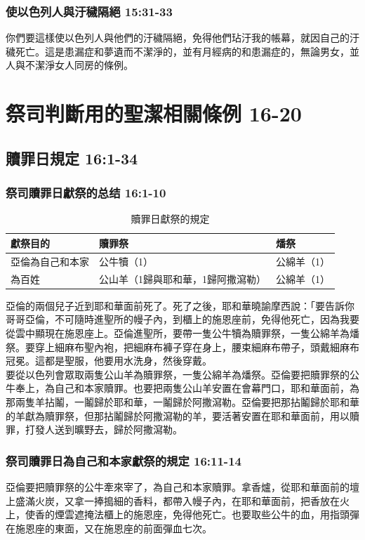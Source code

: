 \subsubsection{使以色列人與汙穢隔絕 15:31-33}
你們要這樣使以色列人與他們的汙穢隔絕，免得他們玷汙我的帳幕，就因自己的汙穢死亡。這是患漏症和夢遺而不潔淨的，並有月經病的和患漏症的，無論男女，並人與不潔淨女人同房的條例。 
    
\section{祭司判斷用的聖潔相關條例 16-20}
\subsection{贖罪日規定 16:1-34}
\subsubsection{祭司贖罪日獻祭的总结 16:1-10}
\begin{table}%
\vspace*{-3mm} 
\centering
\begin{tabular}{ l|l|l }
\hline
\hline
 獻祭目的       &   贖罪祭    &  燔祭        \\ \hline
亞倫為自己和本家& 公牛犢（1） &  公綿羊（1） \\ \hline
為百姓          & 公山羊（1歸與耶和華，1歸阿撒瀉勒） &公綿羊（1）\\\hline
\end{tabular}
\caption{贖罪日獻祭的規定}
\end{table}

亞倫的兩個兒子近到耶和華面前死了。死了之後，耶和華曉諭摩西說：「要告訴你哥哥亞倫，不可隨時進聖所的幔子內，到櫃上的施恩座前，免得他死亡，因為我要從雲中顯現在施恩座上。亞倫進聖所，要帶一隻公牛犢為贖罪祭，一隻公綿羊為燔祭。要穿上細麻布聖內袍，把細麻布褲子穿在身上，腰束細麻布帶子，頭戴細麻布冠冕。這都是聖服，他要用水洗身，然後穿戴。\\
要從以色列會眾取兩隻公山羊為贖罪祭，一隻公綿羊為燔祭。亞倫要把贖罪祭的公牛奉上，為自己和本家贖罪。也要把兩隻公山羊安置在會幕門口，耶和華面前，為那兩隻羊拈鬮，一鬮歸於耶和華，一鬮歸於阿撒瀉勒。亞倫要把那拈鬮歸於耶和華的羊獻為贖罪祭，但那拈鬮歸於阿撒瀉勒的羊，要活著安置在耶和華面前，用以贖罪，打發人送到曠野去，歸於阿撒瀉勒。

\subsubsection{祭司贖罪日為自己和本家獻祭的規定 16:11-14}
亞倫要把贖罪祭的公牛牽來宰了，為自己和本家贖罪。拿香爐，從耶和華面前的壇上盛滿火炭，又拿一捧搗細的香料，都帶入幔子內，在耶和華面前，把香放在火上，使香的煙雲遮掩法櫃上的施恩座，免得他死亡。也要取些公牛的血，用指頭彈在施恩座的東面，又在施恩座的前面彈血七次。


